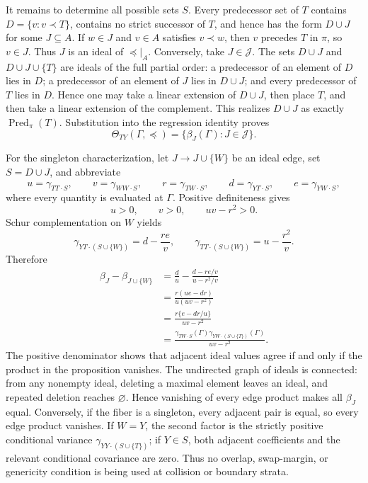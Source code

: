 It remains to determine all possible sets \(S\).  Every predecessor set of \(T\) contains
\(D=\{v:v\prec T\}\), contains no strict successor of \(T\), and hence has the form \(D\cup J\) for some \(J\subseteq A\).  If \(w\in J\) and \(v\in A\) satisfies \(v\prec w\), then \(v\) precedes \(T\) in \(\pi\), so \(v\in J\).  Thus \(J\) is an ideal of \(\preceq|_A\).  Conversely, take \(J\in\mathcal J\).  The sets \(D\cup J\) and \(D\cup J\cup\{T\}\) are ideals of the full partial order: a predecessor of an element of \(D\) lies in \(D\); a predecessor of an element of \(J\) lies in \(D\cup J\); and every predecessor of \(T\) lies in \(D\).  Hence one may take a linear extension of \(D\cup J\), then place \(T\), and then take a linear extension of the complement.  This realizes \(D\cup J\) as exactly \(\operatorname{Pred}_{\pi}(T)\).  Substitution into the regression identity proves
\[
 \Theta_{TY}(\Gamma,\preceq)
 =\{\beta_J(\Gamma):J\in\mathcal J\}.
\]

For the singleton characterization, let \(J\to J\cup\{W\}\) be an ideal edge, set \(S=D\cup J\), and abbreviate
\[
 u=\gamma_{TT\cdot S},\qquad
 v=\gamma_{WW\cdot S},\qquad
 r=\gamma_{TW\cdot S},\qquad
 d=\gamma_{YT\cdot S},\qquad
 e=\gamma_{YW\cdot S},
\]
where every quantity is evaluated at \(\Gamma\).  Positive definiteness gives
\[
 u>0,\qquad v>0,\qquad uv-r^2>0.
\]
Schur complementation on \(W\) yields
\[
 \gamma_{YT\cdot(S\cup\{W\})}=d-\frac{re}{v},
 \qquad
 \gamma_{TT\cdot(S\cup\{W\})}=u-\frac{r^2}{v}.
\]
Therefore
\[
 \begin{aligned}
 \beta_J-\beta_{J\cup\{W\}}
 &=\frac d u-\frac{d-re/v}{u-r^2/v}\\
 &=\frac{r(ue-dr)}{u(uv-r^2)}\\
 &=\frac{r\{e-dr/u\}}{uv-r^2}\\
 &=\frac{\gamma_{TW\cdot S}(\Gamma)
          \gamma_{YW\cdot(S\cup\{T\})}(\Gamma)}
         {uv-r^2}.
 \end{aligned}
\]
The positive denominator shows that adjacent ideal values agree if and only if the product in the proposition vanishes.  The undirected graph of ideals is connected: from any nonempty ideal, deleting a maximal element leaves an ideal, and repeated deletion reaches \(\varnothing\).  Hence vanishing of every edge product makes all \(\beta_J\) equal.  Conversely, if the fiber is a singleton, every adjacent pair is equal, so every edge product vanishes.  If \(W=Y\), the second factor is the strictly positive conditional variance \(\gamma_{YY\cdot(S\cup\{T\})}\); if \(Y\in S\), both adjacent coefficients and the relevant conditional covariance are zero.  Thus no overlap, swap-margin, or genericity condition is being used at collision or boundary strata.

